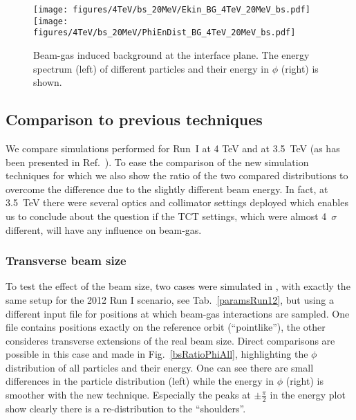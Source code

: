 \begin{figure}%
\centering
\texttt{[image: figures/4TeV/bs\_20MeV/Ekin\_BG\_4TeV\_20MeV\_bs.pdf]}
\texttt{[image: figures/4TeV/bs\_20MeV/PhiEnDist\_BG\_4TeV\_20MeV\_bs.pdf]}
 \caption{Beam-gas induced background at the interface plane. The energy spectrum (left) of different particles and their energy in $\phi$ (right) is shown.
  \label{dist4TeVBGbs}}
\end{figure}
\subsection{Comparison to previous techniques}

We compare simulations performed for Run~I at 4 TeV and at 3.5~TeV (as has been presented in Ref.~\cite{nimPaperRod}). To ease the comparison of the new simulation techniques for which we also show the ratio of the two compared distributions to overcome the difference due to the slightly different beam energy. In fact, at 3.5~TeV there were several optics and collimator settings deployed which enables us to conclude about the question if the TCT settings, which were almost 4~$\sigma$ different, will have any influence on beam-gas. 


\subsubsection{Transverse beam size}
To test the effect of the beam size, two cases were simulated in \fluka, with exactly the same setup for the 2012 Run I scenario, see Tab.~\ref{paramsRun12}, but using a different input file for positions at which beam-gas interactions are sampled. One file contains positions exactly on the reference orbit (``pointlike''), the other consideres transverse extensions of the real beam size. Direct comparisons are possible in this case and made in Fig.~\ref{bsRatioPhiAll}, highlighting the $\phi$ distribution of all particles and their energy. One can see there are small differences in the particle distribution (left) while the energy in $\phi$ (right) is smoother with the new technique. Especially the peaks at $\pm \frac{\pi}{2}$ in the energy plot show clearly there is a re-distribution to the ``shoulders''.


